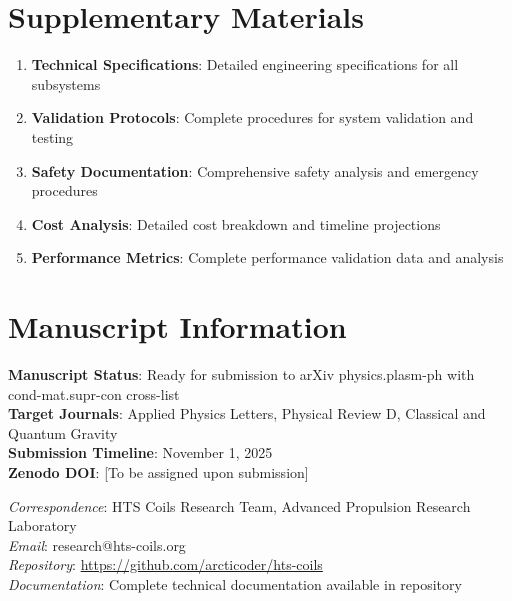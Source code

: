 \documentclass[12pt,a4paper]{article}
\begin{document}


\appendix

\section{Supplementary Materials}

\begin{enumerate}
\item \textbf{Technical Specifications}: Detailed engineering specifications for all subsystems
\item \textbf{Validation Protocols}: Complete procedures for system validation and testing
\item \textbf{Safety Documentation}: Comprehensive safety analysis and emergency procedures
\item \textbf{Cost Analysis}: Detailed cost breakdown and timeline projections
\item \textbf{Performance Metrics}: Complete performance validation data and analysis
\end{enumerate}

\section*{Manuscript Information}

\textbf{Manuscript Status}: Ready for submission to arXiv physics.plasm-ph with cond-mat.supr-con cross-list\\
\textbf{Target Journals}: Applied Physics Letters, Physical Review D, Classical and Quantum Gravity\\
\textbf{Submission Timeline}: November 1, 2025\\
\textbf{Zenodo DOI}: [To be assigned upon submission]

\textit{Correspondence}: HTS Coils Research Team, Advanced Propulsion Research Laboratory\\
\textit{Email}: research@hts-coils.org\\
\textit{Repository}: \url{https://github.com/arcticoder/hts-coils}\\
\textit{Documentation}: Complete technical documentation available in repository
\end{document}
